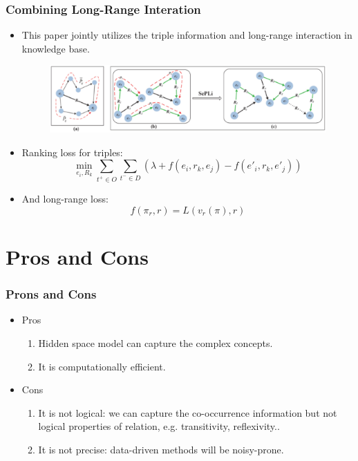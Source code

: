 \documentclass[pdf,10pt]{beamer}
\begin{document}
\begin{frame}
\frametitle{Combining Long-Range Interation \citep{wu2015structured}}
	\begin{itemize}
		\item This paper jointly utilizes the triple information and long-range interaction in knowledge base.
			\begin{figure}
				\centering
				\includegraphics[height=0.15\textwidth]{9.eps}
			\end{figure}
		\item Ranking loss for triples:
			$$\min_{e_i,R_k}\sum_{t^+ \in O}\sum_{t^- \in D}{(\lambda + f(e_i,r_k,e_j) - f(e'_i,r_k,e'_j))}$$
		\item And long-range loss:
			$$f(\pi_r,r) = L(v_r(\pi), r)$$
	\end{itemize}
\end{frame}

\section{Pros and Cons}
\begin{frame}
\frametitle{Prons and Cons}
\begin{itemize}
	\item Pros
		\begin{enumerate}
			\item Hidden space model can capture the complex concepts.
			\item It is computationally efficient.
		\end{enumerate}
	\item Cons
		\begin{enumerate}
			\item It is not logical: we can capture the co-occurrence information but not logical properties of relation, e.g. transitivity, reflexivity..
			\item It is not precise: data-driven methods will be noisy-prone.
		\end{enumerate}
\end{itemize}
\end{frame}



\end{document}
